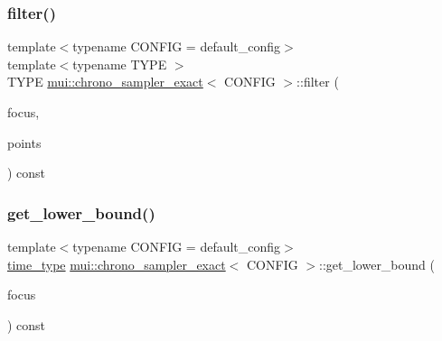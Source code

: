 \subsubsection{\texorpdfstring{filter()}{filter()}}
{\footnotesize\ttfamily template$<$typename C\+O\+N\+F\+IG  = default\+\_\+config$>$ \\
template$<$typename T\+Y\+PE $>$ \\
T\+Y\+PE \hyperlink{classmui_1_1chrono__sampler__exact}{mui\+::chrono\+\_\+sampler\+\_\+exact}$<$ C\+O\+N\+F\+IG $>$\+::filter (\begin{DoxyParamCaption}\item[{\hyperlink{classmui_1_1chrono__sampler__exact_a5f9178b26822fe901f8a1e97ada68d95}{time\+\_\+type}}]{focus,  }\item[{const std\+::vector$<$ std\+::pair$<$ \hyperlink{classmui_1_1chrono__sampler__exact_a5f9178b26822fe901f8a1e97ada68d95}{time\+\_\+type}, T\+Y\+PE $>$ $>$ \&}]{points }\end{DoxyParamCaption}) const\hspace{0.3cm}{\ttfamily [inline]}}

\mbox{\label{classmui_1_1chrono__sampler__exact_a1297822afb4c05df461926a4d234a61d}} 
\subsubsection{\texorpdfstring{get\+\_\+lower\+\_\+bound()}{get\_lower\_bound()}}
{\footnotesize\ttfamily template$<$typename C\+O\+N\+F\+IG  = default\+\_\+config$>$ \\
\hyperlink{classmui_1_1chrono__sampler__exact_a5f9178b26822fe901f8a1e97ada68d95}{time\+\_\+type} \hyperlink{classmui_1_1chrono__sampler__exact}{mui\+::chrono\+\_\+sampler\+\_\+exact}$<$ C\+O\+N\+F\+IG $>$\+::get\+\_\+lower\+\_\+bound (\begin{DoxyParamCaption}\item[{\hyperlink{classmui_1_1chrono__sampler__exact_a5f9178b26822fe901f8a1e97ada68d95}{time\+\_\+type}}]{focus }\end{DoxyParamCaption}) const\hspace{0.3cm}{\ttfamily [inline]}}


